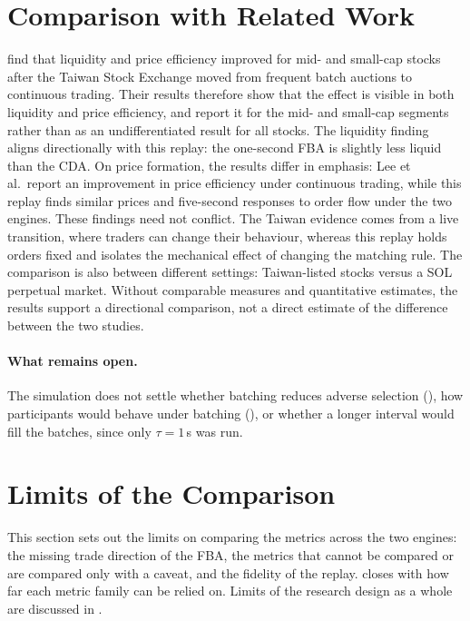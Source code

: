 \section{Comparison with Related Work}
\label{sec:relatedwork}

\citet{lee2026taiwan} find that liquidity and price efficiency improved
for mid- and small-cap stocks after the Taiwan Stock Exchange moved from
frequent batch auctions to continuous trading. Their results therefore
show that the effect is visible in both liquidity and price efficiency,
and report it for the mid- and small-cap segments rather than as an
undifferentiated result for all stocks. The liquidity finding aligns
directionally with this replay: the one-second FBA is slightly less
liquid than the CDA. On price formation, the results differ in emphasis:
Lee et al.\ report an improvement in price efficiency under continuous
trading, while this replay finds similar prices and five-second
responses to order flow under the two engines. These findings need not
conflict. The Taiwan evidence comes from a live transition, where traders
can change their behaviour, whereas this replay holds orders fixed and
isolates the mechanical effect of changing the matching rule. The
comparison is also between different settings: Taiwan-listed stocks
versus a SOL perpetual market. Without comparable measures and
quantitative estimates, the results support a directional comparison,
not a direct estimate of the difference between the two studies.

\paragraph{What remains open.} The simulation does not settle whether
batching reduces adverse selection (), how
participants would behave under batching (),
or whether a longer interval would fill the batches, since only
$\tau = 1$\,s was run.

\section{Limits of the Comparison}
\label{sec:metricreliability}

This section sets out the limits on comparing the metrics across the two
engines: the missing trade direction of the FBA, the metrics that cannot
be compared or are compared only with a caveat, and the fidelity of the
replay.  closes with how far each metric family can
be relied on. Limits of the research design as a whole are discussed in
.

